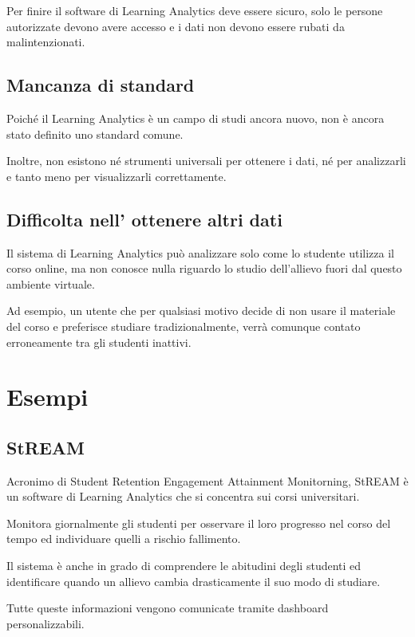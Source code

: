 Per finire il software di Learning Analytics deve essere sicuro, solo le persone autorizzate devono avere accesso e i dati non devono essere rubati da malintenzionati.

\subsection{Mancanza di standard}

Poiché il Learning Analytics è un campo di studi ancora nuovo, non è ancora stato definito uno standard comune.

Inoltre, non esistono né strumenti universali per ottenere i dati, né per analizzarli e tanto meno per visualizzarli correttamente.

\subsection{Difficolta nell' ottenere altri dati}

Il sistema di Learning Analytics può analizzare solo come lo studente utilizza il corso online, ma non conosce nulla riguardo lo studio dell'allievo fuori dal questo ambiente virtuale.

Ad esempio, un utente che per qualsiasi motivo decide di non usare il materiale del corso e preferisce studiare tradizionalmente, verrà comunque contato erroneamente tra gli studenti inattivi.

\cite{gradiant}

\section{Esempi}

\subsection{StREAM}

Acronimo di Student Retention Engagement Attainment Monitorning, StREAM \cite{solutionpath} è un software di Learning Analytics che si concentra sui corsi universitari.

Monitora giornalmente gli studenti per osservare il loro progresso nel corso del tempo ed individuare quelli a rischio fallimento.

Il sistema è anche in grado di comprendere le abitudini degli studenti ed identificare quando un allievo cambia drasticamente il suo modo di studiare.

Tutte queste informazioni vengono comunicate tramite dashboard personalizzabili.

